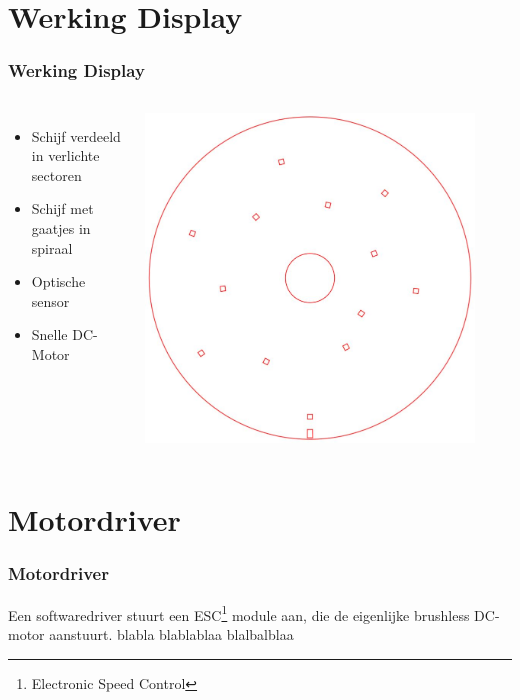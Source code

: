 \documentclass{beamer}
\begin{document}
\section{Werking Display}
\begin{frame}
  \frametitle{Werking Display}

  \begin{columns}
    \begin{itemize}
    \item Schijf verdeeld in verlichte sectoren
    \item Schijf met gaatjes in spiraal
    \item Optische sensor
    \item Snelle DC-Motor
    \end{itemize}

    \includegraphics[width=0.9\textwidth]{img/schijf.jpg}
  \end{columns}
\end{frame}

\section{Motordriver}
\begin{frame}
  \frametitle{Motordriver}

  Een softwaredriver stuurt een ESC\footnote{Electronic Speed Control} module
  aan, die de eigenlijke brushless DC-motor aanstuurt. blabla blablablaa blalbalblaa
\end{frame}
\end{document}

